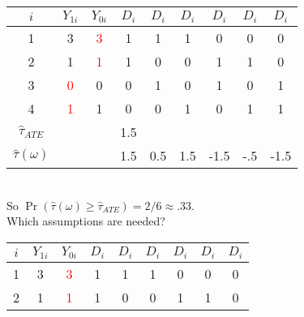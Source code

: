 \documentclass{beamer}
\numberwithin{equation}{section}
\begin{document}
\begin{frame}
\begin{overprint}
\begin{tabular}{cccccccc}
\end{tabular}
\begin{tabular}{ccccccccc}
\multicolumn{1}{p{1cm}}{\center $i$} &   \multicolumn{1}{p{1cm}}{\center $Y_{1i}$} & \multicolumn{1}{p{1cm}}{\center $Y_{0i}$} &   \multicolumn{1}{p{1cm}}{\center $D_{i}$} &\multicolumn{1}{p{.5cm}}{\center $D_{i}$} &\multicolumn{1}{p{.5cm}}{\center $D_{i}$} & \multicolumn{1}{p{.5cm}}{\center $D_{i}$} & \multicolumn{1}{p{.5cm}}{\center $D_{i}$} & \multicolumn{1}{p{.5cm}}{\center $D_{i}$}   \\
\hline
\rowcolor{gray!30}        1 &          3 &        \textcolor{red}{3} &                  1 & 1     & 1 & 0 & 0&0\\
\rowcolor{gray!30}         2 &         1 &       \textcolor{red}{1} &                    1 & 0    & 0 & 1 & 1&0\\
\rowcolor{gray!10}         3 &          \textcolor{red}{0} &         0 &                    0 & 1 & 0 & 1 & 0&1 \\
\rowcolor{gray!10}         4 &          \textcolor{red}{1} &         1 &                    0 & 0 & 1 & 0 & 1&1\\
\hline
$\widehat{\tau}_{ATE}$    &                               &                       &   1.5   &  &   & & &\\
$\hat\tau(\omega)$    &                               &                       & 1.5  &  0.5       &1.5&-1.5&-.5&-1.5  \\
\end{tabular}\vspace{.5in}\\
So $\Pr(\hat\tau(\omega) \geq \widehat{\tau}_{ATE})=2/6\approx.33$.\medskip\\ Which assumptions are needed?
\begin{tabular}{ccccccccc}
 \multicolumn{1}{p{1cm}}{\center $i$} &   \multicolumn{1}{p{1cm}}{\center $Y_{1i}$} & \multicolumn{1}{p{1cm}}{\center $Y_{0i}$} &   \multicolumn{1}{p{1cm}}{\center $D_{i}$} &\multicolumn{1}{p{.5cm}}{\center $D_{i}$} &\multicolumn{1}{p{.5cm}}{\center $D_{i}$} & \multicolumn{1}{p{.5cm}}{\center $D_{i}$} & \multicolumn{1}{p{.5cm}}{\center $D_{i}$} & \multicolumn{1}{p{.5cm}}{\center $D_{i}$}   \\
\hline
\rowcolor{gray!30}        1 &          3 &        \textcolor{red}{3} &                  1 & 1     & 1 & 0 & 0&0\\
\rowcolor{gray!30}         2 &         1 &       \textcolor{red}{1} &                    1 & 0    & 0 & 1 & 1&0\\

\end{tabular}
\end{overprint}
\end{frame}
\end{document}
